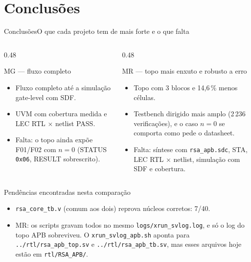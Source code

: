 \documentclass[aspectratio=169,10pt,t]{beamer}
\begin{document}
\section{Conclusões}
\begin{frame}{Conclusões}{O que cada projeto tem de mais forte e o que falta}
  \begin{columns}[T]
    \begin{column}{0.48\textwidth}
      \begin{block}{MG — fluxo completo}
        \scriptsize
        \begin{itemize}
          \item Fluxo completo até a simulação gate-level com SDF.
          \item UVM com cobertura medida e LEC RTL $\times$ netlist PASS.
          \item Falta: o topo ainda expõe F01/F02 com $n = 0$ (STATUS \texttt{0x06}, RESULT sobrescrito).
        \end{itemize}
      \end{block}
    \end{column}
    \begin{column}{0.48\textwidth}
      \begin{block}{MR — topo mais enxuto e robusto a erro}
        \scriptsize
        \begin{itemize}
          \item Topo com 3 blocos e 14,6\,\% menos células.
          \item Testbench dirigido mais amplo (2\,236 verificações), e o caso $n = 0$ se comporta como pede o datasheet.
          \item Falta: síntese com \texttt{rsa\_apb.sdc}, STA, LEC RTL $\times$ netlist, simulação com SDF e cobertura.
        \end{itemize}
      \end{block}
    \end{column}
  \end{columns}
  \vspace{0.2cm}
  \begin{alertblock}{Pendências encontradas nesta comparação}
    \scriptsize
    \begin{itemize}
      \item \texttt{rsa\_core\_tb.v} (comum aos dois) reprova núcleos corretos: 7/40.
      \item MR: os scripts gravam todos no mesmo \texttt{logs/xrun\_svlog.log}, e só o log do topo APB sobreviveu. O \texttt{xrun\_svlog\_apb.sh} aponta para \texttt{../rtl/rsa\_apb\_top.sv} e \texttt{../rtl/rsa\_apb\_tb.sv}, mas esses arquivos hoje estão em \texttt{rtl/RSA\_APB/}.
    \end{itemize}
  \end{alertblock}
\end{frame}
\end{document}

